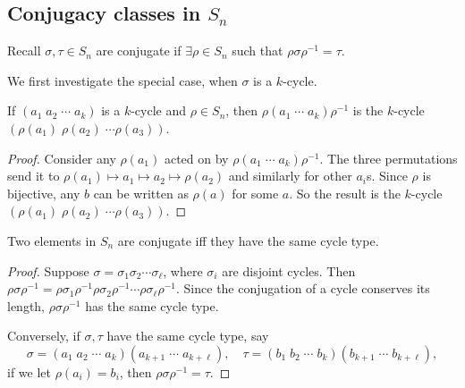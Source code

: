 \documentclass[a4paper]{article}
\begin{document}
\subsection{Conjugacy classes in \texorpdfstring{$S_n$}{Sn}}
Recall $\sigma, \tau\in S_n$ are conjugate if $\exists \rho\in S_n$ such that $\rho \sigma\rho^{-1} = \tau$.

We first investigate the special case, when $\sigma$ is a $k$-cycle.
\begin{prop}
  If $(a_1\; a_2\; \cdots \; a_k)$ is a $k$-cycle and $\rho\in S_n$, then $\rho (a_1\; \cdots\; a_k)\rho^{-1}$ is the $k$-cycle $(\rho(a_1)\; \rho(a_2)\; \cdots \rho(a_3))$.
\end{prop}

\begin{proof}
  Consider any $\rho(a_1)$ acted on by $\rho (a_1\; \cdots\; a_k)\rho^{-1}$. The three permutations send it to $\rho(a_1)\mapsto a_1 \mapsto a_2 \mapsto \rho(a_2)$ and similarly for other $a_i$s. Since $\rho$ is bijective, any $b$ can be written as $\rho(a)$ for some $a$. So the result is the $k$-cycle $(\rho(a_1)\; \rho(a_2)\; \cdots \rho(a_3))$.
\end{proof}

\begin{cor}
  Two elements in $S_n$ are conjugate iff they have the same cycle type.
\end{cor}

\begin{proof}
  Suppose $\sigma = \sigma_1\sigma_2\cdots \sigma_\ell$, where $\sigma_i$ are disjoint cycles. Then $\rho\sigma\rho^{-1} = \rho\sigma_1\rho^{-1}\rho\sigma_2\rho^{-1}\cdots \rho\sigma_\ell\rho^{-1}$. Since the conjugation of a cycle conserves its length, $\rho\sigma\rho^{-1}$ has the same cycle type.

  Conversely, if $\sigma, \tau$ have the same cycle type, say
  \[
    \sigma = (a_1\; a_2\;\cdots\; a_k)(a_{k + 1}\; \cdots \;a_{k + \ell}),\quad \tau = (b_1\; b_2\;\cdots\; b_k)(b_{k + 1}\; \cdots \;b_{k + \ell}),
  \]
  if we let $\rho(a_i) = b_i$, then $\rho\sigma\rho^{-1} = \tau$.
\end{proof}
\end{document}
